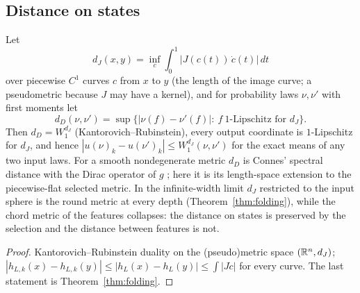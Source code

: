 \subsection{Distance on states}\label{sec:distance}
\begin{proposition}\label{prop:distance}
Let
\[d_J(x,y)=\inf_c\int_0^1|J(c(t))\,\dot c(t)|\,dt\]
over piecewise $C^1$ curves $c$ from $x$ to $y$ (the length of the image curve; a pseudometric because $J$ may have a
kernel), and for probability laws $\nu,\nu'$ with first moments let
\[
d_D(\nu,\nu')=\sup\{|\nu(f)-\nu'(f)|:\ f\ \text{$1$-Lipschitz for }d_J\}.
\]
Then $d_D=W_1^{d_J}$ (Kantorovich--Rubinstein), every output coordinate is $1$-Lipschitz for $d_J$, and hence
$|u(\nu)_k-u(\nu')_k|\le W_1^{d_J}(\nu,\nu')$ for the exact means of any two input laws. For a smooth nondegenerate
metric $d_D$ is Connes' spectral distance with the Dirac operator of $g$ \cite{Connes,Rief}; here it is its
length-space extension to the piecewise-flat selected metric. In the infinite-width limit $d_J$ restricted to the
input sphere is the round metric at every depth (Theorem~\ref{thm:folding}), while the chord metric of the features
collapses: the distance on states is preserved by the selection and the distance between features is not.
\end{proposition}
\begin{proof}
Kantorovich--Rubinstein duality on the (pseudo)metric space $(\mathbb R^n,d_J)$; $|h_{L,k}(x)-h_{L,k}(y)|\le|h_L(x)-h_L(y)|\le
\int|J\dot c|$ for every curve. The last statement is Theorem~\ref{thm:folding}.
\end{proof}
